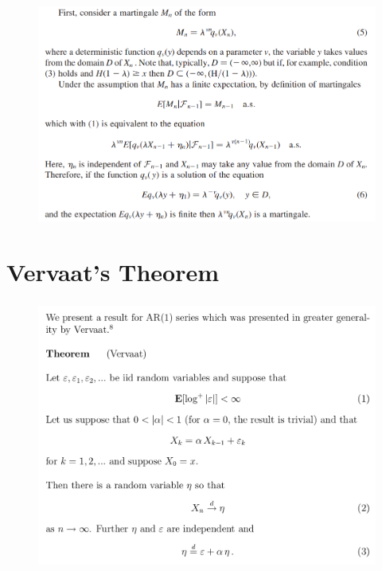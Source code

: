\documentclass[c, dvipsnames, 8pt]{beamer}
\begin{document}
\begin{frame}[shrink=5]
	
	
	\frametitle{\insertsection} 
	\begin{figure}
		\centering
		\includegraphics[width=1\linewidth]{screenshot058}
		\label{fig:screenshot001}
	\end{figure}
	
	
	
	
	
	
	
\end{frame}




\section{Vervaat’s Theorem}


\begin{frame}[shrink=5]
	
	
	\frametitle{\insertsection} 
	\begin{figure}
		\centering
		\includegraphics[width=1\linewidth]{screenshot050}
		\label{fig:screenshot001}
	\end{figure}




	
	
\end{frame}
\end{document}
